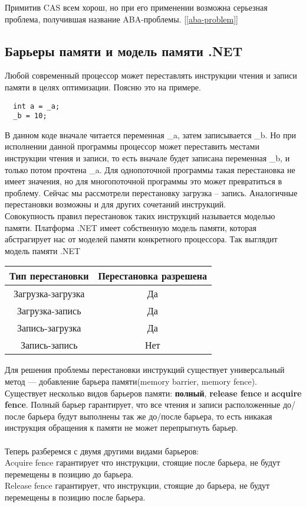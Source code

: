 \documentclass{article}
\begin{document}
Примитив CAS всем хорош, но при его применении возможна серьезная проблема, получившая название ABA-проблемы. [\ref{aba-problem}]

\subsection{Барьеры памяти и модель памяти .NET}

Любой современный процессор может переставлять инструкции чтения и записи памяти в целях оптимизации. Поясню это на примере.

\begin{lstlisting}
  int a = _a;
  _b = 10;
\end{lstlisting}

В данном коде вначале читается переменная \_a, затем записывается \_b. Но при исполнении данной программы процессор может переставить местами инструкции чтения и записи, то есть вначале будет записана переменная \_b, и только потом прочтена \_a. Для однопоточной программы такая перестановка не имеет значения, но для многопоточной программы это может превратиться в проблему. Сейчас мы рассмотрели перестановку загрузка – запись. Аналогичные перестановки возможны и для других сочетаний инструкций.\\

Совокупность правил перестановок таких инструкций называется моделью памяти. Платформа .NET имеет собственную модель памяти, которая абстрагирует нас от моделей памяти конкретного процессора. 
Так выглядит модель памяти .NET \\

\begin{tabular}{ | c | c | }
\hline
Тип перестановки & Перестановка разрешена \\
\hline
Загрузка-загрузка & Да \\
Загрузка-запись & Да \\
Запись-загрузка & Да \\
Запись-запись & Нет \\
\hline
\end{tabular}

Для решения проблемы перестановки инструкций существует универсальный метод — добавление барьера памяти(memory barrier, memory fence). \\

Существует несколько видов барьеров памяти: \textbf{полный}, \textbf{release fence} и \textbf{acquire fence}. Полный барьер гарантирует, что все чтения и записи расположенные до/после барьера будут выполнены так же до/после барьера, то есть никакая инструкция обращения к памяти не может перепрыгнуть барьер. \\ \\
Теперь разберемся с двумя другими видами барьеров:\\
Acquire fence гарантирует что инструкции, стоящие после барьера, не будут перемещены в позицию до барьера.\\
Release fence гарантирует, что инструкции, стоящие до барьера, не будут перемещены в позицию после барьера.\\
\end{document}
